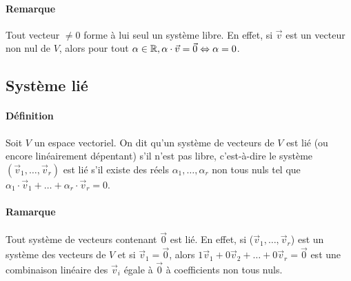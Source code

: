 \paragraph{Remarque} Tout vecteur $\neq 0$ forme à lui seul un système libre. En effet, si $\vec{v}$ est un vecteur non nul de $V$, alors pour tout $\alpha \in \mathbb{R},  \alpha \cdot \vec{v} = \vec{0} \Leftrightarrow \alpha = 0$.


%
\subsection{Système lié}
%
\paragraph{Définition} Soit $V$ un espace vectoriel. On dit qu'un système de vecteurs de $V$ est lié (ou encore linéairement dépentant) s'il n'est pas libre, c'est-à-dire le système $(\vec{v}_1, \ldots, \vec{v}_r)$ est lié s'il existe des réels $\alpha_1, \ldots, \alpha_r$ non tous nuls tel que $\alpha_1 \cdot \vec{v}_1 + \ldots + \alpha_r \cdot \vec{v}_r = 0$.
\paragraph{Ramarque} Tout système de vecteurs contenant $\vec{0}$ est lié. En effet, si ($\vec{v}_1, \dotsc, \vec{v}_r$) est un système des vecteurs de $V$ et si $\vec{v}_1=\vec{0}$, alors $1 \vec{v}_1+0 \vec{v}_2+\dotsc+0 \vec{v}_r=\vec{0}$ est une combinaison linéaire des $\vec{v}_i$ égale à $\vec{0}$ à coefficients non tous nuls.

